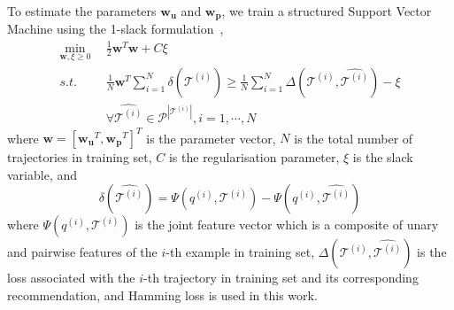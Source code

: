 To estimate the parameters $\mathbf{w_u}$ and $\mathbf{w_p}$, we train a structured Support Vector Machine
using the 1-slack formulation~\cite{ssvm09},
\begin{align*}
    \min_{\mathbf{w}, \xi \ge 0} ~~& \frac{1}{2} \mathbf{w}^T \mathbf{w} + C \xi \\
    s.t. ~~& \frac{1}{N} \mathbf{w}^T \sum_{i=1}^N \delta \left( \hat{\mathcal{T}^{(i)}} \right) \ge
             \frac{1}{N} \sum_{i=1}^N \Delta \left( \mathcal{T}^{(i)}, \hat{\mathcal{T}^{(i)}} \right) - \xi \\
         ~~& \forall \hat{\mathcal{T}^{(i)}} \in \mathcal{P}^{|\mathcal{T}^{(i)}|}, i = 1, \cdots, N
\end{align*}
where $\mathbf{w} = [\mathbf{w_u}^T, \mathbf{w_p}^T]^T$ is the parameter vector,
$N$ is the total number of trajectories in training set, $C$ is the regularisation parameter,
$\xi$ is the slack variable, and
\begin{displaymath}
    \delta \left( \hat{\mathcal{T}^{(i)}} \right) = \Psi \left( q^{(i)}, \mathcal{T}^{(i)} \right) - 
                                                    \Psi \left( q^{(i)}, \hat{\mathcal{T}^{(i)}} \right)
\end{displaymath}
where $\Psi \left( q^{(i)}, \mathcal{T}^{(i)} \right)$ is the joint feature vector which is a composite of unary and 
pairwise features of the $i$-th example in training set,
$\Delta \left( \mathcal{T}^{(i)}, \hat{\mathcal{T}^{(i)}} \right)$ is the loss associated with the $i$-th trajectory 
in training set and its corresponding recommendation, and Hamming loss is used in this work.
